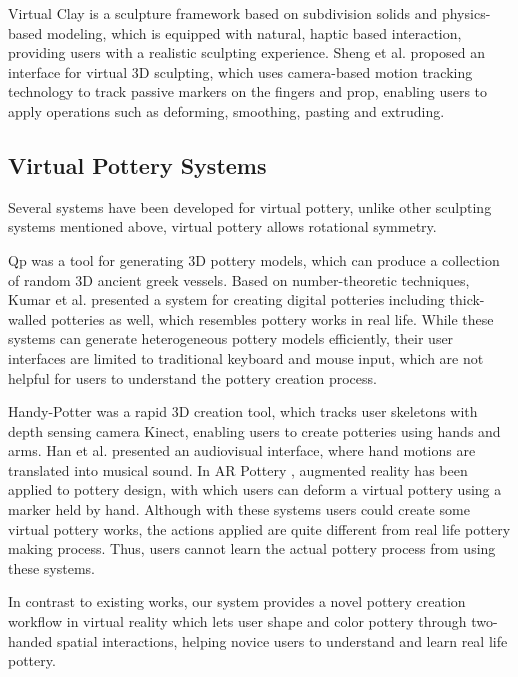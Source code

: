 Virtual Clay \cite{mcdonnell2001virtual} is a sculpture framework based on subdivision solids and physics-based modeling, which is equipped with natural, haptic based interaction, providing users with a realistic sculpting experience. Sheng et al. \cite{sheng2006interface} proposed an interface for virtual 3D sculpting, which uses camera-based motion tracking technology to track passive markers on the fingers and prop, enabling users to apply operations such as deforming, smoothing, pasting and extruding.

\subsection{Virtual Pottery Systems}
\label{sec:2.3}


Several systems have been developed for virtual pottery, unlike other sculpting systems mentioned above, virtual pottery allows rotational symmetry.

Qp \cite{koutsoudis2009qp} was a tool for generating 3D pottery models, which can produce a collection of random 3D ancient greek vessels.
Based on number-theoretic techniques, Kumar et al. \cite{kumar2011wheel} presented a system for creating digital potteries including thick-walled potteries as well, which resembles pottery works in real life.
While these systems can generate heterogeneous pottery models efficiently, their user interfaces are limited to traditional keyboard and mouse input, which are not helpful for users to understand the pottery creation process.

Handy-Potter \cite{murugappan2013handy} was a rapid 3D creation tool, which tracks user skeletons with depth sensing camera Kinect, enabling users to create potteries using hands and arms.
Han et al. \cite{han2014virtual} presented an audiovisual interface, where hand motions are translated into musical sound.
In AR Pottery \cite{han2007ar}, augmented reality has been applied to pottery design, with which users can deform a virtual pottery using a marker held by hand.
Although with these systems users could create some virtual pottery works, the actions applied are quite different from real life pottery making process. Thus, users cannot learn the actual pottery process from using these systems.

In contrast to existing works, our system provides a novel pottery creation workflow in virtual reality which lets user shape and color pottery through two-handed spatial interactions, helping novice users to understand and learn real life pottery.



